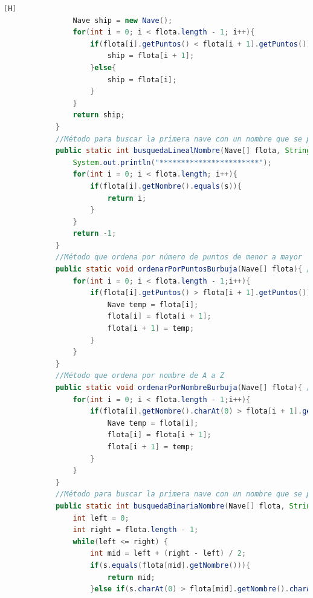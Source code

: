 \documentclass{article}
\begin{document}
\begin{lstlisting}[language=java,caption={Las lineas de codigo de lo creado:}][H]
				Nave ship = new Nave();
				for(int i = 0; i < flota.length - 1; i++){
					if(flota[i].getPuntos() < flota[i + 1].getPuntos()){
						ship = flota[i + 1];
					}else{
						ship = flota[i];
					}
				}
				return ship;
			}
			//Método para buscar la primera nave con un nombre que se pidió por teclado
			public static int busquedaLinealNombre(Nave[] flota, String s){ //METODO CREADO PARA LA BUSQUEDA DE LA PRIMERA NAVE QUE ES IGUAL AL NOMBRE QUE ESCRIBIMOS
				System.out.println("***********************");
				for(int i = 0; i < flota.length; i++){
					if(flota[i].getNombre().equals(s)){
						return i;
					}
				}
				return -1;
			}
			//Método que ordena por número de puntos de menor a mayor
			public static void ordenarPorPuntosBurbuja(Nave[] flota){ //COMPLETAMOS ESTE METODO QUE NOS PERMITE ORDENAR DE MENOR A MAYOR DE LA MANERA DE ORDENAR BURBUJA QUE SERIA CAMBIAR POSCIONES SI TU ELEMENTO DE ADELANTE ES MENOR AL ACTUAL
				for(int i = 0; i < flota.length - 1;i++){
					if(flota[i].getPuntos() > flota[i + 1].getPuntos()){
						Nave temp = flota[i];
						flota[i] = flota[i + 1];
						flota[i + 1] = temp;
					}
				}
			}
			//Método que ordena por nombre de A a Z
			public static void ordenarPorNombreBurbuja(Nave[] flota){ //COMPLETAMOS ESTE METODO QUE NOS PERMITE ORDENAR DE A HASTA Z PARA ESTO COMPARAMOS EL PRIMER CARACTER DE CADA UNA Y SI ESTA ACTUAL ES MAYOR A LA SIGUIENTE ESTA CAMBIARA DE POSICION
				for(int i = 0; i < flota.length - 1;i++){
					if(flota[i].getNombre().charAt(0) > flota[i + 1].getNombre().charAt(0)){
						Nave temp = flota[i];
						flota[i] = flota[i + 1];
						flota[i + 1] = temp;
					}
				}
			}
			//Método para buscar la primera nave con un nombre que se pidió por teclado
			public static int busquedaBinariaNombre(Nave[] flota, String s){ // Metodo completado que nos permite buscar la nave con el nombre ingresado  este funciona en la que ponemos de limites una izquierda y una derecha que son los limites del arreglo y despues este se va reduciendo su limte dependiendo en donde se encuentre nuestra nave desada capaz si esta atras de nuestra mitad esta va reducir su derecha poniendo a esta como la mitad - 1 y si esta adelante de la mitad esta reducira su izquierda poniendo a esta como la mitad + 1 y asi sucesivamente y va a parar cuando si la derecha sea menor a la izquierda y nos dara como resultado que la nave no fue encontrada
				int left = 0;
				int right = flota.length - 1;
				while(left <= right) {
					int mid = left + (right - left) / 2;
					if(s.equals(flota[mid].getNombre())){
						return mid;
					}else if(s.charAt(0) > flota[mid].getNombre().charAt(0)){

\end{lstlisting}
\end{document}
